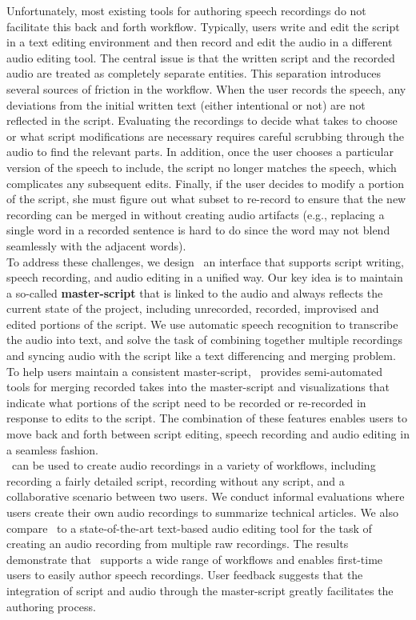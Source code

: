 Unfortunately, most existing tools for authoring speech recordings do not facilitate this back and forth workflow. Typically, users write and edit the script in a text editing environment and then record and edit the audio in a different audio editing tool. The central issue  is that the written script and the recorded audio are treated as completely separate entities.
%
This separation introduces several sources of friction in the workflow. When the user records the speech, any deviations from the initial written text (either intentional or not) are not reflected in the script. Evaluating the recordings to decide what takes to choose or what script modifications are necessary requires careful scrubbing through the audio to find the relevant parts. In addition, once the user chooses a particular version of the speech to include, the script no longer matches the speech, which complicates any subsequent edits. Finally, if the user decides to modify a portion of the script, she must figure out what subset to re-record to ensure that the new recording can be merged in without creating audio artifacts (e.g., replacing a single word in a recorded sentence is hard to do since the word may not blend seamlessly with the adjacent words).\\

To address these challenges, we design \voicescript\, an interface that supports script writing, speech recording, and audio editing in a unified way. Our key idea is to maintain a so-called \textbf{master-script} that is linked to the audio and always reflects the current state of the project, including unrecorded, recorded, improvised and edited portions of the script. We use automatic speech recognition to transcribe the audio into text, and solve the task of combining together multiple recordings and syncing audio with the script like a text differencing and merging problem. To help users maintain a consistent master-script, \voicescript\ provides semi-automated tools for merging recorded takes into the master-script and visualizations that indicate what portions of the script need to be recorded or re-recorded in response to edits to the script. The combination of these features enables users to move back and forth between script editing, speech recording and audio editing in a seamless fashion.\\

\voicescript\ can be used to create audio recordings in a variety of workflows, including recording a fairly detailed script, recording without any script, and a collaborative scenario between two users. We conduct informal evaluations where users create their own audio recordings to summarize technical articles. We also compare \voicescript\ to a state-of-the-art text-based audio editing tool for the task of creating an audio recording from multiple raw recordings. The results demonstrate that \voicescript\ supports a wide range of workflows and enables first-time users to  easily author speech recordings. User feedback suggests that the integration of script and audio through the master-script greatly facilitates the authoring process. 

